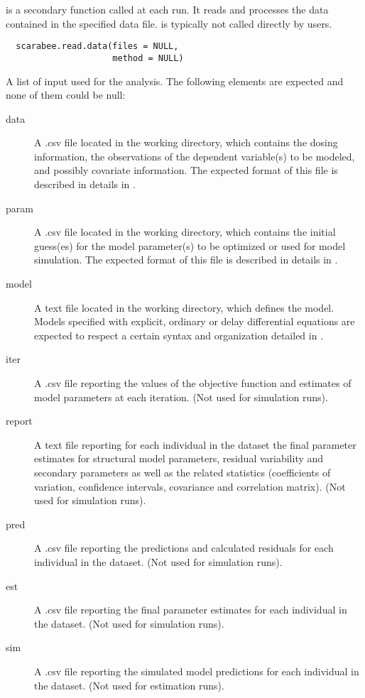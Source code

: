 %
\begin{Description}\relax
{} is a secondary function called at each 
 run. It reads and processes the data contained in the specified
data file. is typically not called directly by users.
\end{Description}
%
\begin{Usage}
\begin{verbatim}
  scarabee.read.data(files = NULL,
                     method = NULL)
\end{verbatim}
\end{Usage}
%
\begin{Arguments}
\begin{ldescription}
\item[\code{files}] A list of input used for the analysis. The following elements are
expected and none of them could be null: \begin{description}

\item[data] A .csv file located in the working directory, which contains
the dosing information, the observations of the dependent variable(s)
to be modeled, and possibly covariate information. The expected format 
of this file is described in details in .
\item[param] A .csv file located in the working directory, which contains
the initial guess(es) for the model parameter(s) to be optimized or used
for model simulation. The expected format of this file is described in
details in .
\item[model] A text file located in the working directory, which defines 
the model. Models specified with explicit, ordinary or delay 
differential equations are expected to respect a certain syntax and 
organization detailed in .
\item[iter] A .csv file reporting the values of the objective function
and estimates of model parameters at each iteration.  (Not used for 
simulation runs).
\item[report] A text file reporting for each individual in the dataset the
final parameter estimates for structural model parameters, residual 
variability and secondary parameters as well as the related statistics 
(coefficients of variation, confidence intervals, covariance and 
correlation matrix). (Not used for simulation runs).
\item[pred] A .csv file reporting the predictions and calculated residuals
for each individual in the dataset. (Not used for simulation runs).
\item[est] A .csv file reporting the final parameter estimates for each
individual in the dataset. (Not used for simulation runs).
\item[sim] A .csv file reporting the simulated model predictions for each 
individual in the dataset. (Not used for estimation runs).


\end{description}
\end{ldescription}
\end{Arguments}
